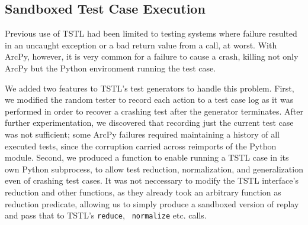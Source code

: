 \subsection{Sandboxed Test Case Execution}

Previous use of TSTL had been limited to testing systems where failure
resulted in an uncaught exception or a bad return value from a call,
at worst.  With ArcPy, however, it is very common for a failure to
cause a crash, killing not only ArcPy but the Python environment
running the test case.

We added two features to TSTL's test generators to handle this
problem.  First, we modified the random tester to record each action
to a test case log as it was performed in order to recover a crashing
test after the generator terminates.  After further experimentation,
we discovered that recording just the current test case was not
sufficient; some ArcPy failures required maintaining a history of all
executed tests, since the corruption carried across reimports of the
Python module.  Second, we produced a function
to enable running a TSTL case in its own Python subprocess, to allow
test reduction, normalization, and generalization even of crashing
test cases.  It was not neccessary to modify the TSTL interface's
reduction and other functions, as they already took an arbitrary
function as reduction predicate, allowing us to simply produce a
sandboxed version of replay and pass that to TSTL's {\tt reduce}, {\tt
  normalize} etc. calls.